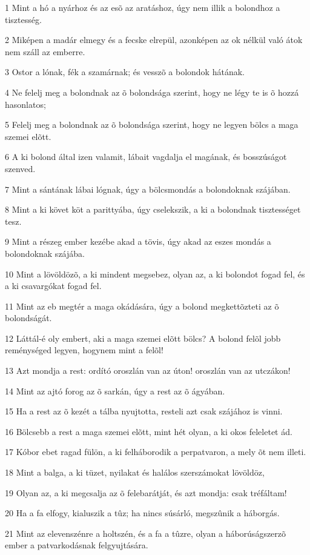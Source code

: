 \par 1 Mint a hó a nyárhoz és az esõ az aratáshoz, úgy nem illik a bolondhoz a tisztesség.
\par 2 Miképen a madár elmegy és a fecske elrepül, azonképen az ok nélkül való átok nem száll az emberre.
\par 3 Ostor a lónak, fék a szamárnak; és vesszõ  a bolondok hátának.
\par 4 Ne felelj meg a bolondnak az õ bolondsága szerint, hogy ne légy te is õ hozzá hasonlatos;
\par 5 Felelj meg a bolondnak az õ bolondsága szerint, hogy ne legyen bölcs a maga szemei elõtt.
\par 6 A ki bolond által izen valamit, lábait vagdalja el magának, és bosszúságot szenved.
\par 7 Mint a sántának lábai lógnak, úgy a bölcsmondás a bolondoknak szájában.
\par 8 Mint a ki követ köt a parittyába, úgy cselekszik, a ki a bolondnak tisztességet tesz.
\par 9 Mint a részeg ember kezébe akad a tövis, úgy akad az eszes mondás a bolondoknak szájába.
\par 10 Mint a lövöldözõ, a ki mindent megsebez, olyan az, a ki bolondot fogad fel, és a ki csavargókat fogad fel.
\par 11 Mint az eb megtér a maga okádására, úgy a bolond megkettõzteti az õ bolondságát.
\par 12 Láttál-é oly embert, aki a maga szemei elõtt bölcs? A bolond felõl jobb reménységed legyen, hogynem mint a felõl!
\par 13 Azt mondja a rest: ordító oroszlán van az úton! oroszlán van az utczákon!
\par 14 Mint az ajtó forog az õ sarkán, úgy a rest az õ ágyában.
\par 15 Ha a rest az õ kezét a tálba nyujtotta, resteli azt csak szájához is vinni.
\par 16 Bölcsebb a rest a maga szemei elõtt, mint hét olyan, a ki okos feleletet ád.
\par 17 Kóbor ebet ragad fülön, a ki felháborodik a perpatvaron, a mely õt nem illeti.
\par 18 Mint a balga, a ki tüzet, nyilakat és halálos szerszámokat lövöldöz,
\par 19 Olyan az, a ki megcsalja az õ felebarátját, és azt mondja: csak tréfáltam!
\par 20 Ha a fa elfogy, kialuszik a tûz; ha nincs súsárló, megszûnik a háborgás.
\par 21 Mint az elevenszénre a holtszén, és a fa a tûzre, olyan a háborúságszerzõ ember a patvarkodásnak felgyujtására.
